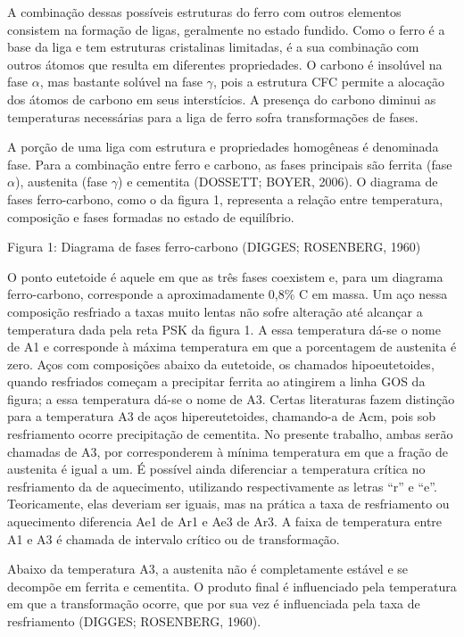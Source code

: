 \documentclass[hidelinks,brazil,dissertacao,epusp]{usp}
\begin{document}
A combinação dessas possíveis estruturas do ferro com outros elementos consistem na formação de ligas, geralmente no estado fundido. Como o ferro é a base da liga e tem estruturas cristalinas limitadas, é a sua combinação com outros átomos que resulta em diferentes propriedades. O carbono é insolúvel na fase $\alpha$, mas bastante solúvel na fase $\gamma$, pois a estrutura CFC permite a alocação dos átomos de carbono em seus interstícios. A presença do carbono diminui as temperaturas necessárias para a liga de ferro sofra transformações de fases.

A porção de uma liga com estrutura e propriedades homogêneas é denominada fase. Para a combinação entre ferro e carbono, as fases principais são ferrita (fase $\alpha$), austenita (fase $\gamma$) e cementita (DOSSETT; BOYER, 2006). O diagrama de fases ferro-carbono, como o da figura 1, representa a relação entre temperatura, composição e fases formadas no estado de equilíbrio. 


Figura 1: Diagrama de fases ferro-carbono (DIGGES; ROSENBERG, 1960)

O ponto eutetoide é aquele em que as três fases coexistem e, para um diagrama ferro-carbono, corresponde a aproximadamente 0,8\% C em massa. Um aço nessa composição resfriado a taxas muito lentas não sofre alteração até alcançar a temperatura dada pela reta PSK da figura 1. A essa temperatura dá-se o nome de A1 e corresponde à máxima temperatura em que a porcentagem de austenita é zero. Aços com composições abaixo da eutetoide, os chamados hipoeutetoides, quando resfriados começam a precipitar ferrita ao atingirem a linha GOS da figura; a essa temperatura dá-se o nome de A3. Certas literaturas fazem distinção para a temperatura A3 de aços hipereutetoides, chamando-a de Acm, pois sob resfriamento ocorre precipitação de cementita. No presente trabalho, ambas serão chamadas de A3, por corresponderem à mínima temperatura em que a fração de austenita é igual a um. É possível ainda diferenciar a temperatura crítica no resfriamento da de aquecimento, utilizando respectivamente as letras ``r'' e ``e''. Teoricamente, elas deveriam ser iguais, mas na prática a taxa de resfriamento ou aquecimento diferencia Ae1 de Ar1 e Ae3 de Ar3. A faixa de temperatura entre A1 e A3 é chamada de intervalo crítico ou de transformação. 

Abaixo da temperatura A3, a austenita não é completamente estável e se decompõe em ferrita e cementita. O produto final é influenciado pela temperatura em que a transformação ocorre, que por sua vez é influenciada pela taxa de resfriamento (DIGGES; ROSENBERG, 1960).
\end{document}

